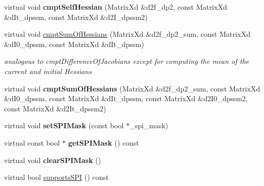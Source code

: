 \begin{DoxyCompactItemize}
\item 
\hypertarget{classAppearanceModel_a4d4f07a1240bb49de9d6113943fe7aa1}{virtual void {\bfseries cmpt\-Self\-Hessian} (Matrix\-Xd \&d2f\-\_\-dp2, const Matrix\-Xd \&d\-It\-\_\-dpssm, const Matrix\-Xd \&d2\-I\-\_\-dpssm2)}\label{classAppearanceModel_a4d4f07a1240bb49de9d6113943fe7aa1}

\item 
\hypertarget{classAppearanceModel_ad8171a2e748a9cbc22f3c7d7381c670b}{virtual void \hyperlink{classAppearanceModel_ad8171a2e748a9cbc22f3c7d7381c670b}{cmpt\-Sum\-Of\-Hessians} (Matrix\-Xd \&d2f\-\_\-dp2\-\_\-sum, const Matrix\-Xd \&d\-I0\-\_\-dpssm, const Matrix\-Xd \&d\-It\-\_\-dpssm)}\label{classAppearanceModel_ad8171a2e748a9cbc22f3c7d7381c670b}

\begin{DoxyCompactList}\small\item\em analogous to cmpt\-Difference\-Of\-Jacobians except for computing the mean of the current and initial Hessians \end{DoxyCompactList}\item 
\hypertarget{classAppearanceModel_afc5bac85b112cc975be844744ee8ccff}{virtual void {\bfseries cmpt\-Sum\-Of\-Hessians} (Matrix\-Xd \&d2f\-\_\-dp2\-\_\-sum, const Matrix\-Xd \&d\-I0\-\_\-dpssm, const Matrix\-Xd \&d\-It\-\_\-dpssm, const Matrix\-Xd \&d2\-I0\-\_\-dpssm2, const Matrix\-Xd \&d2\-It\-\_\-dpssm2)}\label{classAppearanceModel_afc5bac85b112cc975be844744ee8ccff}

\item 
\hypertarget{classAppearanceModel_a1db42141a7b09b554cd77ce4e7d7d25c}{virtual void {\bfseries set\-S\-P\-I\-Mask} (const bool $\ast$\-\_\-spi\-\_\-mask)}\label{classAppearanceModel_a1db42141a7b09b554cd77ce4e7d7d25c}

\item 
\hypertarget{classAppearanceModel_a45f6a5f859fb6418b848bc9c4478dbd3}{virtual const bool $\ast$ {\bfseries get\-S\-P\-I\-Mask} () const }\label{classAppearanceModel_a45f6a5f859fb6418b848bc9c4478dbd3}

\item 
\hypertarget{classAppearanceModel_ab368ad2693bb06b7e6b77b77afb92321}{virtual void {\bfseries clear\-S\-P\-I\-Mask} ()}\label{classAppearanceModel_ab368ad2693bb06b7e6b77b77afb92321}

\item 
\hypertarget{classAppearanceModel_a119b97402d3bb7041d921961e3722cf4}{virtual bool \hyperlink{classAppearanceModel_a119b97402d3bb7041d921961e3722cf4}{supports\-S\-P\-I} () const }\label{classAppearanceModel_a119b97402d3bb7041d921961e3722cf4}


\end{DoxyCompactItemize}
